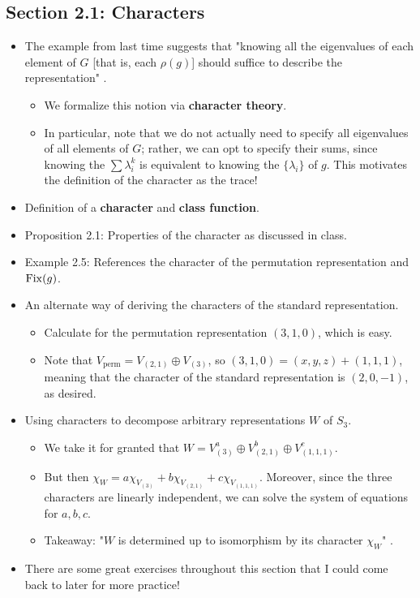 \documentclass[../notes.tex]{subfiles}
\begin{document}
\subsection*{Section 2.1: Characters}
\begin{itemize}
    \item The example from last time suggests that "knowing all the eigenvalues of each element of $G$ [that is, each $\rho(g)$] should suffice to describe the representation" \parencite[12]{bib:FultonHarris}.
    \begin{itemize}
        \item We formalize this notion via \textbf{character theory}.
        \item In particular, note that we do not actually need to specify all eigenvalues of all elements of $G$; rather, we can opt to specify their sums, since knowing the $\sum\lambda_i^k$ is equivalent to knowing the $\{\lambda_i\}$ of $g$. This motivates the definition of the character as the trace!
    \end{itemize}
    \item Definition of a \textbf{character} and \textbf{class function}.
    \item Proposition 2.1: Properties of the character as discussed in class.
    \item Example 2.5: References the character of the permutation representation and $\operatorname{Fix}(g)$.
    \item An alternate way of deriving the characters of the standard representation.
    \begin{itemize}
        \item Calculate for the permutation representation $(3,1,0)$, which is easy.
        \item Note that $V_\text{perm}=V_{(2,1)}\oplus V_{(3)}$, so $(3,1,0)=(x,y,z)+(1,1,1)$, meaning that the character of the standard representation is $(2,0,-1)$, as desired.
    \end{itemize}
    \item Using characters to decompose arbitrary representations $W$ of $S_3$.
    \begin{itemize}
        \item We take it for granted that $W=V_{(3)}^a\oplus V_{(2,1)}^b\oplus V_{(1,1,1)}^c$.
        \item But then $\chi_W=a\chi_{V_{(3)}}+b\chi_{V_{(2,1)}}+c\chi_{V_{(1,1,1)}}$. Moreover, since the three characters are linearly independent, we can solve the system of equations for $a,b,c$.
        \item Takeaway: "$W$ is determined up to isomorphism by its character $\chi_W$" \parencite[14]{bib:FultonHarris}.
    \end{itemize}
    \item There are some great exercises throughout this section that I could come back to later for more practice!
\end{itemize}
\end{document}
